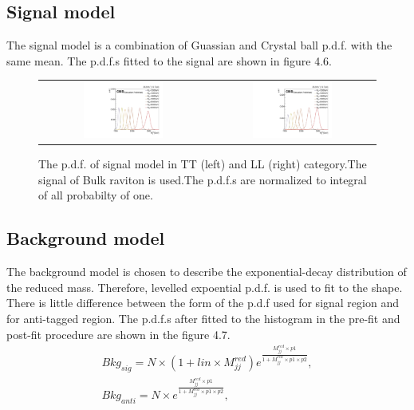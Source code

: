 \begin{itemize}
\subsection{Signal model}
The signal model is a combination of Guassian and Crystal ball p.d.f. with the same mean. The p.d.f.s fitted to the signal are shown in figure 4.6.  
\begin{figure}[t]
  \centering
 \begin{tabular}{cc}
    \includegraphics[width=0.5\textwidth]{Figures/sigMod/TT.pdf} &
   \includegraphics[width=0.5\textwidth]{Figures/sigMod/LL.pdf} \\
  \end{tabular}
  \caption{The p.d.f. of signal model in TT (left) and LL (right) category.The signal of Bulk raviton is used.The p.d.f.s are normalized to integral of all probabilty of one.}
  \label{fig:hvt_brs}
\end{figure}

\subsection{Background model}
The background model is chosen to describe the exponential-decay distribution of the reduced mass. Therefore, levelled expoential p.d.f. is used to fit to the shape. There is little difference between the form of the p.d.f used for signal region and for anti-tagged region. The p.d.f.s after fitted to the histogram in the pre-fit and post-fit procedure are shown in the figure 4.7. %
\begin{equation} \label{eq5}
\begin{split}
Bkg_{sig} = N \times (1 + lin \times M^{red}_{jj})e^{\frac{M^{red}_{jj}\times p1}{1+M^{red}_{jj} \times p1 \times p2}}, \\
Bkg_{anti} = N \times e^{\frac{M^{red}_{jj}\times p1}{1+M^{red}_{jj} \times p1 \times p2}},
\end{split} 
\end{equation}




\end{itemize}
